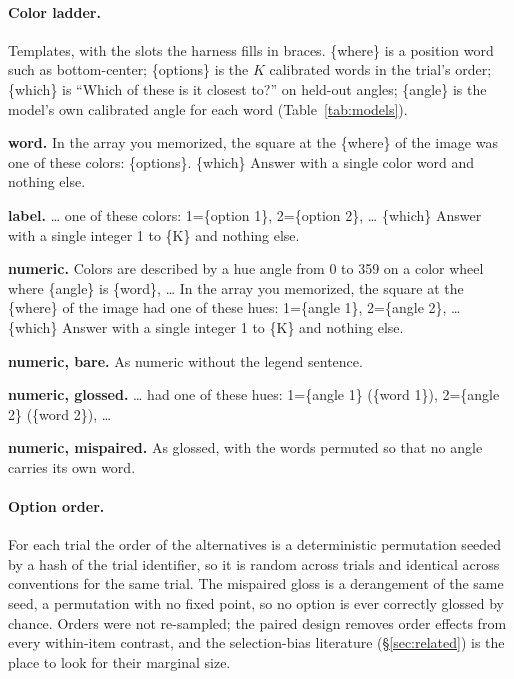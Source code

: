 \paragraph{Color ladder.} Templates, with the slots the harness fills in
braces. \{where\} is a position word such as bottom-center; \{options\} is the
$K$ calibrated words in the trial's order; \{which\} is ``Which of these is it
closest to?'' on held-out angles; \{angle\} is the model's own calibrated angle
for each word (Table~\ref{tab:models}).

{\small\ttfamily\raggedright
\textbf{word.} In the array you memorized, the square at the \{where\} of the
image was one of these colors: \{options\}. \{which\} Answer with a single color
word and nothing else.

\textbf{label.} \ldots{} one of these colors: 1=\{option 1\}, 2=\{option 2\},
\ldots{} \{which\} Answer with a single integer 1 to \{K\} and nothing else.

\textbf{numeric.} Colors are described by a hue angle from 0 to 359 on a color
wheel where \{angle\} is \{word\}, \ldots{} In the array you memorized, the
square at the \{where\} of the image had one of these hues: 1=\{angle 1\},
2=\{angle 2\}, \ldots{} \{which\} Answer with a single integer 1 to \{K\} and
nothing else.

\textbf{numeric, bare.} As numeric without the legend sentence.

\textbf{numeric, glossed.} \ldots{} had one of these hues: 1=\{angle 1\}
(\{word 1\}), 2=\{angle 2\} (\{word 2\}), \ldots

\textbf{numeric, mispaired.} As glossed, with the words permuted so that no
angle carries its own word.
\par}

\paragraph{Option order.} For each trial the order of the alternatives is a
deterministic permutation seeded by a hash of the trial identifier, so it is
random across trials and identical across conventions for the same trial. The
mispaired gloss is a derangement of the same seed, a permutation with no fixed
point, so no option is ever correctly glossed by chance. Orders were not
re-sampled; the paired design removes order effects from every within-item
contrast, and the selection-bias literature (\S\ref{sec:related}) is the place
to look for their marginal size.


